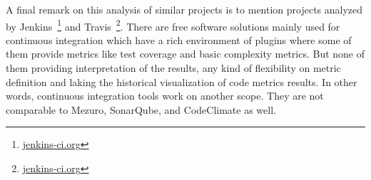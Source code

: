 A final remark on this analysis of similar projects is to mention projects
analyzed by Jenkins~\footnote{\url{jenkins-ci.org}} and
Travis~\footnote{\url{jenkins-ci.org}}. There are free software solutions
mainly used for continuous integration which have a rich environment of plugins
where some of them provide metrics like test coverage and basic complexity
metrics. But none of them providing interpretation of the results, any kind of
flexibility on metric definition and laking the historical visualization of
code metrics results. In other words, continuous integration tools work on
another scope. They are not comparable to Mezuro, SonarQube, and CodeClimate as
well.
